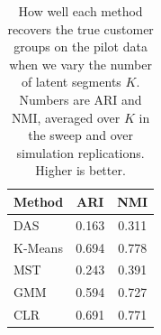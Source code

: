 \begin{table}[htbp]
\centering
\caption{How well each method recovers the true customer groups on the pilot data when we vary the number of latent segments $K$. Numbers are ARI and NMI, averaged over $K$ in the sweep and over simulation replications. Higher is better.}
\label{tab:app-ari-nmi-varying-K-avg}
\begin{tabular}{lcc}
\toprule
Method & ARI & NMI \\
\midrule
DAS & 0.163 & 0.311 \\
K-Means & 0.694 & 0.778 \\
MST & 0.243 & 0.391 \\
GMM & 0.594 & 0.727 \\
CLR & 0.691 & 0.771 \\
\bottomrule
\end{tabular}
\end{table}
